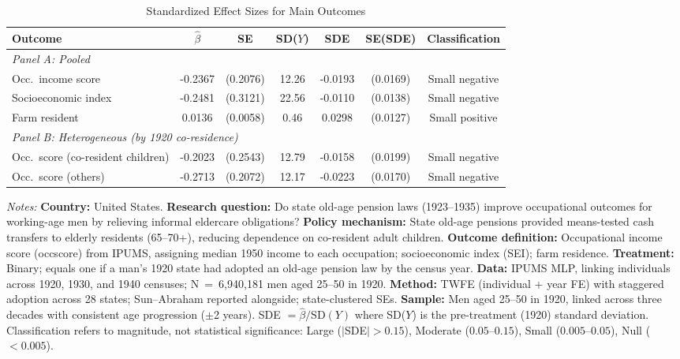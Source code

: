 \begin{table}[H]
\centering
\caption{Standardized Effect Sizes for Main Outcomes}
\label{tab:sde}
\begin{adjustbox}{max width=\textwidth}
\begin{threeparttable}
\begin{tabular}{lcccccc}
\toprule
Outcome & $\hat{\beta}$ & SE & SD($Y$) & SDE & SE(SDE) & Classification \\
\midrule
\multicolumn{7}{l}{\textit{Panel A: Pooled}} \\
Occ.\ income score & -0.2367 & (0.2076) & 12.26 & -0.0193 & (0.0169) & Small negative \\
Socioeconomic index & -0.2481 & (0.3121) & 22.56 & -0.0110 & (0.0138) & Small negative \\
Farm resident & 0.0136 & (0.0058) & 0.46 & 0.0298 & (0.0127) & Small positive \\
\midrule
\multicolumn{7}{l}{\textit{Panel B: Heterogeneous (by 1920 co-residence)}} \\
Occ.\ score (co-resident children) & -0.2023 & (0.2543) & 12.79 & -0.0158 & (0.0199) & Small negative \\
Occ.\ score (others) & -0.2713 & (0.2072) & 12.17 & -0.0223 & (0.0170) & Small negative \\
\bottomrule
\end{tabular}
\begin{tablenotes}[flushleft]\footnotesize
\item \textit{Notes:} \textbf{Country:} United States.
\textbf{Research question:} Do state old-age pension laws (1923--1935) improve occupational outcomes for working-age men by relieving informal eldercare obligations?
\textbf{Policy mechanism:} State old-age pensions provided means-tested cash transfers to elderly residents (65--70+), reducing dependence on co-resident adult children.
\textbf{Outcome definition:} Occupational income score (occscore) from IPUMS, assigning median 1950 income to each occupation; socioeconomic index (SEI); farm residence.
\textbf{Treatment:} Binary; equals one if a man's 1920 state had adopted an old-age pension law by the census year.
\textbf{Data:} IPUMS MLP, linking individuals across 1920, 1930, and 1940 censuses; N~=~6,940,181 men aged 25--50 in 1920.
\textbf{Method:} TWFE (individual + year FE) with staggered adoption across 28 states; Sun--Abraham reported alongside; state-clustered SEs.
\textbf{Sample:} Men aged 25--50 in 1920, linked across three decades with consistent age progression ($\pm$2 years).
SDE $= \hat{\beta} / \text{SD}(Y)$ where SD($Y$) is the pre-treatment (1920) standard deviation.
Classification refers to magnitude, not statistical significance: Large ($|$SDE$| > 0.15$), Moderate ($0.05$--$0.15$), Small ($0.005$--$0.05$), Null ($< 0.005$).
\end{tablenotes}
\end{threeparttable}
\end{adjustbox}
\end{table}

